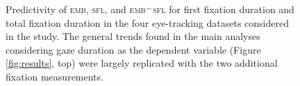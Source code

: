 \begin{figure}[htp]
\begin{center}
{}
\end{center}
\caption{Predictivity of \textsc{emb}, \textsc{sfl}, and \textsc{emb}$^\frown$\textsc{sfl} for first fixation duration and total fixation duration in the four eye-tracking datasets considered in the study. The general trends found in the main analyses considering gaze duration as the dependent variable (Figure \ref{fig:results}, top) were largely replicated with the two additional fixation measurements. }
\label{fig:fix_measurements}

\end{figure}
